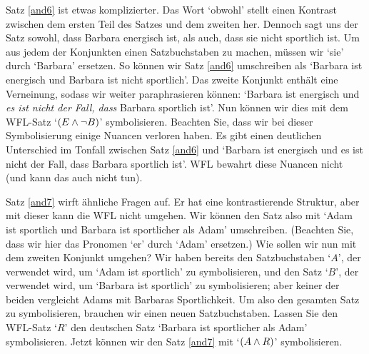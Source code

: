 Satz \ref{and6} ist etwas komplizierter. Das Wort `obwohl' stellt einen Kontrast zwischen dem ersten Teil des Satzes und dem zweiten her. Dennoch sagt uns der Satz sowohl, dass Barbara energisch ist, als auch, dass sie nicht sportlich ist. Um aus jedem der Konjunkten einen Satzbuchstaben zu machen, müssen wir `sie' durch `Barbara' ersetzen. So können wir Satz \ref{and6} umschreiben als `Barbara ist energisch und Barbara ist nicht sportlich'. Das zweite Konjunkt enthält eine Verneinung, sodass wir weiter paraphrasieren können: `Barbara ist energisch und \emph{es ist nicht der Fall, dass} Barbara sportlich ist'. Nun können wir dies mit dem WFL-Satz `$(E \wedge \neg B)$' symbolisieren. Beachten Sie, dass wir bei dieser Symbolisierung einige Nuancen verloren haben. Es gibt einen deutlichen Unterschied im Tonfall zwischen Satz \ref{and6} und `Barbara ist energisch und es ist nicht der Fall, dass Barbara sportlich ist'. WFL bewahrt diese Nuancen nicht (und kann das auch nicht tun).

Satz \ref{and7} wirft ähnliche Fragen auf. Er hat eine kontrastierende Struktur, aber mit dieser kann die WFL nicht umgehen. Wir können den Satz also mit `Adam ist sportlich und Barbara ist sportlicher als Adam' umschreiben. (Beachten Sie, dass wir hier das Pronomen `er' durch `Adam' ersetzen.) Wie sollen wir nun mit dem zweiten Konjunkt umgehen? Wir haben bereits den Satzbuchstaben `$A$', der verwendet wird, um `Adam ist sportlich' zu symbolisieren, und den Satz `$B$', der verwendet wird, um `Barbara ist sportlich' zu symbolisieren; aber keiner der beiden vergleicht Adams mit Barbaras Sportlichkeit. Um also den gesamten Satz zu symbolisieren, brauchen wir einen neuen Satzbuchstaben. Lassen Sie den WFL-Satz `$R$' den deutschen Satz `Barbara ist sportlicher als Adam' symbolisieren. Jetzt können wir den Satz \ref{and7} mit `$(A \wedge R)$' symbolisieren.


